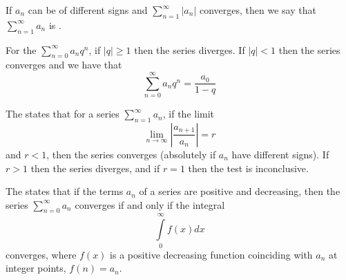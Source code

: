 \documentclass[12pt, a4paper, oneside, openright, titlepage]{book}
\begin{document}
\begin{defn}
        If $a_n$ can be of different signs and $\sum\limits_{n=1}^{\infty}|a_n|$ converges, then we say that $\sum\limits_{n=1}^{\infty}a_n$ is .
\end{defn}



\begin{defn}
        For the  $\sum\limits_{n=0}^{\infty}a_nq^n$, if $|q| \geq 1$ then the series diverges. If $|q| < 1$ then  the series converges and we have that \begin{equation}
                \sum\limits_{n=0}^{\infty}a_nq^n = \frac{a_0}{1-q}
        \end{equation}
\end{defn}





\begin{thm}
        The  states that for a series $\sum\limits_{n=1}^{\infty}a_n$, if the limit \begin{equation}
                \lim\limits_{n\rightarrow \infty}\left|\frac{a_{n+1}}{a_n}\right| = r
        \end{equation}
        and $r < 1$, then the series converges (absolutely if $a_n$ have different signs). If $r > 1$ then the series diverges, and if $r=1$ then the test is inconclusive.
\end{thm}




\begin{thm}
        The  states that if the terms $a_n$ of a series are positive and decreasing, then the series $\sum\limits_{n=0}^{\infty}a_n$ converges if and only if the integral \begin{equation}
                \int\limits_{0}^{\infty}f(x)dx
        \end{equation}
        converges, where $f(x)$ is a positive decreasing function coinciding with $a_n$ at integer points, $f(n) = a_n$.
\end{thm}


\begin{figure}[H]
        \centering
\end{figure}
\end{document}
